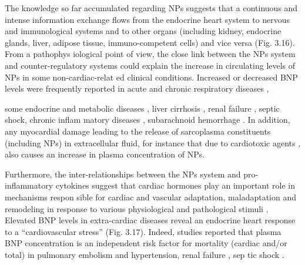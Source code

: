 \documentclass[14pt,a4paper,onecolumn]{extarticle}
\begin{document}
The knowledge so far accumulated regarding NPs suggests that a continuous and intense information exchange flows from the endocrine heart system to nervous and immunological systems and to other organs (including kidney, endocrine glands, liver, adipose tissue, immuno-competent cells) and vice versa (Fig. 3.16). From a pathophys iological point of view, the close link between the NPs system and counter-regulatory systems could explain the increase in circulating levels of NPs in some non-cardiac-relat ed clinical conditions. Increased or decreased BNP levels were frequently reported in acute and chronic respiratory diseases \citep{121} \citep{122} \citep{123} \citep{bib382} \citep{126} \citep{bib383} \citep{128} \citep{129},

 some endocrine and metabolic diseases \citep{141}, liver cirrhosis \citep{142} \citep{143} \citep{144}, renal failure \citep{100} \citep{144}, septic shock, chronic inflam matory diseases \citep{145} \citep{146} \citep{61} \citep{149}, subarachnoid hemorrhage \citep{150} \citep{153}. In addition, any myocardial damage leading to the release of sarcoplasma constituents (including NPs) in extracellular fluid, for instance that due to cardiotoxic agents \citep{157} \citep{161}, also causes an increase in plasma concentration of NPs.



Furthermore, the inter-relationships between the NPs system and pro-inflammatory cytokines suggest that cardiac hormones play an important role in mechanisms respon sible for cardiac and vascular adaptation, maladaptation and remodeling in response to various physiological and pathological stimuli \citep{32} \citep{35}.  Elevated BNP levels in extra-cardiac diseases reveal an endocrine heart response to a “cardiovascular stress” (Fig. 3.17). Indeed,  studies reported that plasma BNP concentration is an independent risk factor for mortality (cardiac and/or total) in pulmonary embolism \citep{121} \citep{123} \citep{bib382} and hypertension, renal failure \citep{28} \citep{100} \citep{144}, sep tic shock \citep{145}.
\end{document}
